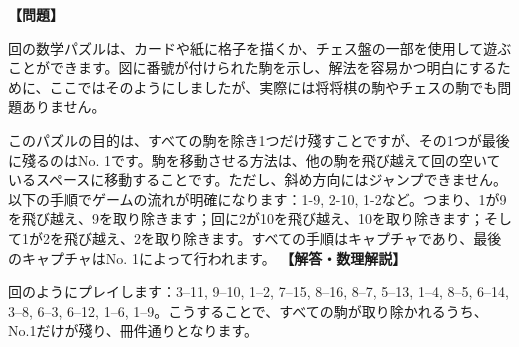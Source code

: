 \documentclass[10pt,a4paper,oneside,openany]{ltjsbook}
\begin{document}
\begin{tcolorbox}[colback=softblue,colframe=primaryblue,title=\textbf{第 359 問：COUNTER SOLITAIRE.},arc=2mm,boxrule=1pt,breakable]
\textbf{【問題】}\par\vspace{0.3em}
回の数学パズルは、カードや紙に格子を描くか、チェス盤の一部を使用して遊ぶことができます。図に番號が付けられた駒を示し、解法を容易かつ明白にするために、ここではそのようにしましたが、実際には将将棋の駒やチェスの駒でも問題ありません。

このパズルの目的は、すべての駒を除き1つだけ殘すことですが、その1つが最後に殘るのはNo. 1です。駒を移動させる方法は、他の駒を飛び越えて回の空いているスペースに移動することです。ただし、斜め方向にはジャンプできません。以下の手順でゲームの流れが明確になります：1-9, 2-10, 1-2など。つまり、1が9を飛び越え、9を取り除きます；回に2が10を飛び越え、10を取り除きます；そして1が2を飛び越え、2を取り除きます。すべての手順はキャプチャであり、最後のキャプチャはNo. 1によって行われます。
\tcblower
\textbf{【解答・数理解説】}\par\vspace{0.3em}
回のようにプレイします：3--11, 9--10, 1--2, 7--15, 8--16, 8--7, 5--13, 1--4, 8--5, 6--14, 3--8, 6--3, 6--12, 1--6, 1--9。こうすることで、すべての駒が取り除かれるうち、No.1だけが殘り、冊件通りとなります。
\end{tcolorbox}
\end{document}
